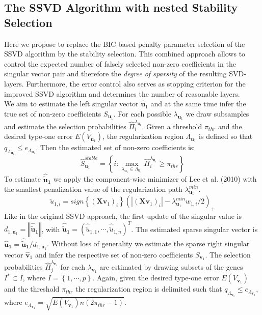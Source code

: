 \subsection{The SSVD Algorithm with nested Stability Selection}
Here we propose to replace the BIC based penalty parameter selection of the SSVD algorithm by the stability selection. 
This combined approach allows to control the expected number of falsely selected non-zero coefficients in the singular vector pair and therefore the \textit{degree of sparsity} of the resulting SVD-layers. Furthermore, the error control also serves as stopping criterion for the improved SSVD algorithm and determines the number of reasonable layers. \\
We aim to estimate the left singular vector $\mathbf{\hat{u}}_{1}$ and at the same time infer the true set of non-zero coefficients $S_{\mathbf{u}_{1}}$.
For each possible $\lambda_{\mathbf{u}_{1}}$ we draw subsamples and estimate the selection probabilities $\hat{\Pi}_{i}^{\lambda_{\mathbf{u}_{1}}}$.
Given a threshold $\pi_{thr}$ and the desired type-one error $E(V_{\mathbf{u}_{1}})$, the regularization region $\Lambda_{\mathbf{u}_{1}}$ is defined so that $q_{\Lambda_{\mathbf{u}_{1}}} \leq e_{\Lambda_{\mathbf{u}_{1}}}$.
Then the estimated set of non-zero coefficients is:\\
\begin{equation}
\hat{S}_{\mathbf{u}_{1}}^{stable}=\left\{i: \max_{\lambda_{\mathbf{u}_{1}} \in \Lambda_{\mathbf{u}_{1}}} \hat{\Pi}_{i}^{\lambda_{\mathbf{u}_{1}}} \geq \pi_{thr} \right\}
\end{equation}
To estimate $\mathbf{\hat{\tilde{u}}_{1}}$ we apply the component-wise minimizer of Lee et al. (2010) with the smallest penalization value of the regularization path $\lambda_{\mathbf{u}_{1}}^{min}$.
\begin{equation}
\hat{\tilde{u}}_{1,i}=\textit{sign} \left\{(\mathbf{X}\mathbf{v}_{1})_{i} \right\} (|(\mathbf{X}\mathbf{v}_{1})_{i}|- \lambda^{min}_{\mathbf{u}_{1}}w_{1,i}/2)_{+} 
\end{equation}
Like in the original SSVD approach, the first update of the singular value is $d_{1,\mathbf{u}_{1}}=\left\Vert\mathbf{\hat{\tilde{u}}_{1}}\right\Vert$, with 
$\mathbf{\hat{\tilde{u}}_{1}}=(\hat{\tilde{u}}_{1,1},\cdots,\hat{\tilde{u}}_{1,n})^{T}$. The estimated sparse singular vector is  $\mathbf{\hat{u}_{1}}=\mathbf{\hat{\tilde{u}}_{1}}/d_{1,\mathbf{u}_{1}}$.
Without loss of generality we estimate the sparse right singular vector $\mathbf{\hat{v}}_{1}$ and infer the respective set of non-zero coefficients $S_{\mathbf{v}_{1}}$. The selection probabilities $\hat{\Pi}_{j}^{\lambda_{\mathbf{v}_{1}}}$ for each $\lambda_{\mathbf{v}_{1}}$ are estimated by drawing subsets of the genes $I^{*} \subset I$, where $I=\left\{1,\cdots,p \right\}$. Again, given the desired type-one error $E(V_{\mathbf{v}_{1}})$ and the threshold $\pi_{thr}$ the regularization region is delimited such that $q_{\Lambda_{\mathbf{v}_{1}}} \leq e_{\Lambda_{\mathbf{v}_{1}}}$, where $e_{\Lambda_{\mathbf{v}_{1}}}= \sqrt{E(V_{\mathbf{v}_{1}})n(2\pi_{thr}-1)}$. 
